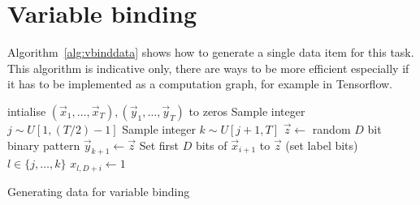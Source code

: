\section{Variable binding}\label{sec:vbindpseudo}
Algorithm~\ref{alg:vbinddata} shows how to generate a single data item for this task. This algorithm
is indicative only, there are ways to be more efficient especially if it has to be implemented as a
computation graph, for example in Tensorflow.

\begin{algorithm}
	\BlankLine
	intialise \((\vec{x}_1,\ldots,\vec{x}_T), (\vec{y}_1,\ldots,\vec{y}_T)\) to zeros\;
	 {
		Sample integer \(j \sim U[1, (T/2)-1]\) 
		Sample integer \(k \sim U[j+1, T]\) 
		\(\vec{z} \gets\) random \(D\) bit binary pattern\;
		\(\vec{y}_{k+1} \gets \vec{z}\)\;
		Set first \(D\) bits of \(\vec{x}_{i+1}\) to \(\vec{z}\)\;
		\For(set label bits){\(l \in \{j,\ldots,k\}\)}{
			\({x}_{l, D+i} \gets 1\)\;
		}
	}
	
	\caption{Generating data for variable binding}
	\label{alg:vbinddata}
\end{algorithm}